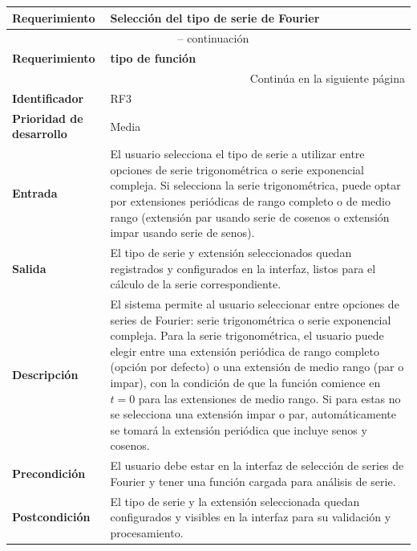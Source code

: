 \begin{longtable}{|m{3.5cm}|m{9.5cm}|}
	\hline
	\rowcolor{black!75} \color{white}\textbf{Requerimiento} & \color{white}\textbf{Selección del tipo de serie de Fourier} \\
	\hline
	\endfirsthead
	\multicolumn{2}{c}{{\tablename\ \thetable{} -- continuación}} \\
	\hline
	\rowcolor{black!75} \color{white}\textbf{Requerimiento} & \color{white}\textbf{tipo de función} \\
	\hline
	\endhead
	\hline \multicolumn{2}{r}{{Continúa en la siguiente página}} \\
	\endfoot
	\hline
	\endlastfoot
	
	\textbf{Identificador} & RF3 \\
	\hline
	\textbf{Prioridad de desarrollo} & Media \\
	\hline
	\textbf{Entrada} & El usuario selecciona el tipo de serie a utilizar entre opciones de serie trigonométrica o serie exponencial compleja. Si selecciona la serie trigonométrica, puede optar por extensiones periódicas de rango completo o de medio rango (extensión par usando serie de cosenos o extensión impar usando serie de senos). \\
	\hline
	\textbf{Salida} & El tipo de serie y extensión seleccionados quedan registrados y configurados en la interfaz, listos para el cálculo de la serie correspondiente. \\
	\hline
	\textbf{Descripción} & El sistema permite al usuario seleccionar entre opciones de series de Fourier: serie trigonométrica o serie exponencial compleja. Para la serie trigonométrica, el usuario puede elegir entre una extensión periódica de rango completo (opción por defecto) o una extensión de medio rango (par o impar), con la condición de que la función comience en \( t = 0 \) para las extensiones de medio rango. Si para estas no se selecciona una extensión impar o par, automáticamente se tomará la extensión periódica que incluye senos y cosenos. \\
	\hline
	\textbf{Precondición} & El usuario debe estar en la interfaz de selección de series de Fourier y tener una función cargada para análisis de serie. \\
	\hline
	\textbf{Postcondición} & El tipo de serie y la extensión seleccionada quedan configurados y visibles en la interfaz para su validación y procesamiento. \\
	\hline
\end{longtable}
\caption{Requerimiento funcional No. 3} \label{tabla:RF3}
\vspace{0.5cm}

